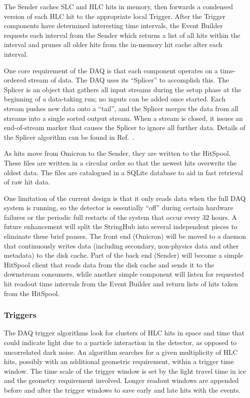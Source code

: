The Sender caches SLC and HLC hits in memory, then forwards a
condensed version of each HLC hit to the appropriate local Trigger. After the
Trigger components have determined interesting time intervals, 
the Event Builder requests each interval from the Sender which returns a list of
all hits within the interval and prunes all older hits from the in-memory hit
cache after each interval.

One core requirement of the DAQ is that each component operates on a
time-ordered stream of data.  The DAQ uses its ``Splicer'' to accomplish
this.  The Splicer is an object that gathers all input streams
during the setup phase at the beginning of a data-taking run; no inputs can
be added once started.  Each stream 
pushes new data onto a ``tail'', and the Splicer merges the data from all
streams into a single sorted output stream.  When a stream is closed, it
issues an end-of-stream marker that causes the Splicer to
ignore all further data.  Details of the Splicer algorithm can be found in
Ref.~\cite{vlvnt13_trigger}.  

As hits move from Omicron to the Sender, they are written to the
HitSpool.  These files are
written in a circular order so that the newest hits overwrite the oldest
data.  The files are catalogued in a SQLite database to
aid in fast retrieval of raw hit data.

One limitation of the current design is that it only reads data when
the full DAQ system is running, so the detector is essentially ``off''
during certain hardware failures or the periodic full restarts of the
system that occur every 32 hours.  A future enhancement 
will split the StringHub into several independent pieces to eliminate these
brief pauses.  The front end (Omicron) will be moved to a daemon
that continuously writes data (including secondary, non-physics data and
other metadata) to the disk cache.  Part of the back end (Sender) 
will become a simple HitSpool client that reads data from the disk cache
and sends it to the downstream consumers, while another simple component
will listen for requested hit readout time intervals from the Event Builder
and return lists of hits taken from the HitSpool.

\subsubsection{\label{sect:online:trigger}Triggers}

The DAQ trigger algorithms look for clusters of HLC hits in space and time
that could indicate light due to a particle interaction in the detector, as
opposed to uncorrelated dark noise.   An algorithm searches for a given
multiplicity of HLC hits, possibly with an additional geometric
requirement, within a trigger time window.  The time scale of the trigger window is
set by the light travel time in ice and the geometry requirement
involved. Longer readout windows are appended before and after the trigger
windows to save early and late hits with the events.

